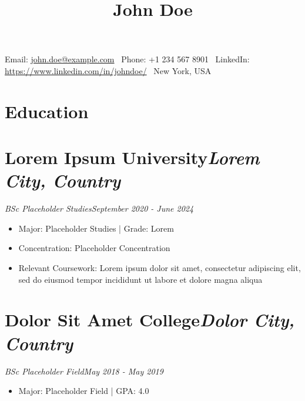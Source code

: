 \documentclass[8pt,letter]{article}%
\title{\vspace{-1.125cm}\textbf{\Huge John Doe}\vspace{-0.5cm}}%
\author{}%
\date{\vspace{-3\baselineskip}}%
\begin{document}
%
\normalsize%
%
\maketitle%
\vspace{-0.2cm}%
\begin{center}Email: \href{mailto:john.doe@example.com}{john.doe@example.com} \ Phone: +1 234 567 8901 \ LinkedIn: \href{https://www.linkedin.com/in/johndoe/}{https://www.linkedin.com/in/johndoe/} \ New York, USA\end{center}%
\vspace{-0.5cm}%
\vspace{-0.2cm}%
\section*{\large\textbf{Education}}%
\vspace{-0.5cm}%
\noindent\makebox[\linewidth]{\rule{\linewidth}{0.4pt}}%
\vspace{-0.16cm}%
\vspace{-0.4cm}%
\section*{\fontsize{10}{12}\selectfont\textbf{Lorem Ipsum University}\hfill\textit{Lorem City, Country}}%
\label{sec:fontsize1012selectfonttextbfLoremIpsumUniversityhfilltextitLoremCity,Country}%
\vspace{-0.3cm}\textit{BSc Placeholder Studies}\hfill\textit{September 2020 - June 2024}\vspace{-0.1cm}%
\begin{itemize}%
\item%
Major: Placeholder Studies | Grade: Lorem%
\item%
Concentration: Placeholder Concentration%
\item%
Relevant Coursework: Lorem ipsum dolor sit amet, consectetur adipiscing elit, sed do eiusmod tempor incididunt ut labore et dolore magna aliqua%
\end{itemize}

%
\vspace{0cm}%
\vspace{-0.4cm}%
\section*{\fontsize{10}{12}\selectfont\textbf{Dolor Sit Amet College}\hfill\textit{Dolor City, Country}}%
\label{sec:fontsize1012selectfonttextbfDolorSitAmetCollegehfilltextitDolorCity,Country}%
\vspace{-0.3cm}\textit{BSc Placeholder Field}\hfill\textit{May 2018 - May 2019}\vspace{-0.1cm}%
\begin{itemize}%
\item%
Major: Placeholder Field | GPA: 4.0%
\end{itemize}
\end{document}
